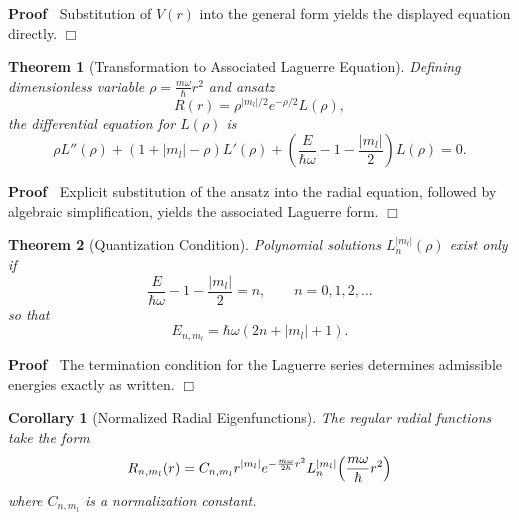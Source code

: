 \documentclass{article}
\newenvironment{proof}{\noindent\textbf{Proof\ }}{\hspace*{\fill}$\Box$\medskip}
\newtheorem{corollary}{Corollary}
\newtheorem{theorem}{Theorem}
\begin{document}
\begin{proof}
  Substitution of $V (r)$ into the general form yields the displayed equation
  directly.
\end{proof}

\begin{theorem}
  [Transformation to Associated Laguerre Equation] Defining dimensionless
  variable $\rho = \frac{m \omega}{\hbar} r^2$ and ansatz
  \begin{equation}
    R (r) = \rho^{|m_l | / 2} e^{- \rho / 2} L (\rho),
  \end{equation}
  the differential equation for $L (\rho)$ is
  \begin{equation}
    \rho L'' (\rho) + (1 + |m_l | - \rho) L' (\rho) + \left( \frac{E}{\hbar
    \omega} - 1 - \frac{|m_l |}{2} \right) L (\rho) = 0.
  \end{equation}
\end{theorem}

\begin{proof}
  Explicit substitution of the ansatz into the radial equation, followed by
  algebraic simplification, yields the associated Laguerre form.
\end{proof}

\begin{theorem}
  [Quantization Condition] Polynomial solutions $L_n^{|m_l |} (\rho)$ exist
  only if
  \begin{equation}
    \frac{E}{\hbar \omega} - 1 - \frac{|m_l |}{2} = n, \qquad n = 0, 1, 2,
    \ldots
  \end{equation}
  so that
  \begin{equation}
    E_{n, m_l} = \hbar \omega (2 n + |m_l | + 1) .
  \end{equation}
\end{theorem}

\begin{proof}
  The termination condition for the Laguerre series determines admissible
  energies exactly as written.
\end{proof}

\begin{corollary}
  [Normalized Radial Eigenfunctions] The regular radial functions take the
  form
  \begin{equation}
    R_{n, m_l} (r) = C_{n, m_l} r^{|m_l |} e^{- \frac{m \omega}{2 \hbar} r^2}
    L_n^{|m_l |}  \hspace{-0.17em} \left( \frac{m \omega}{\hbar} r^2 \right)
  \end{equation}
  where $C_{n, m_l}$ is a normalization constant.
\end{corollary}
\end{document}

